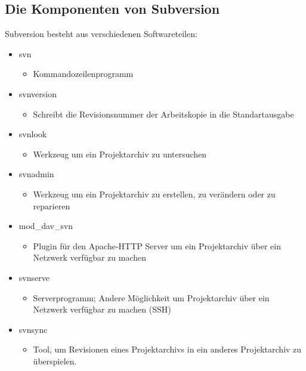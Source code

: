 \subsection{Die Komponenten von Subversion}
Subversion besteht aus verschiedenen Softwareteilen:
\begin{itemize}
    \item svn
        \begin{itemize}
            \item Kommandozeilenprogramm
        \end{itemize}
    \item svnversion
        \begin{itemize}
            \item Schreibt die Revisionsnummer der Arbeitskopie in die Standartausgabe
        \end{itemize}
    \item svnlook
        \begin{itemize}
            \item Werkzeug um ein Projektarchiv zu untersuchen
        \end{itemize}
    \item svnadmin
        \begin{itemize}
            \item Werkzeug um ein Projektarchiv zu erstellen, zu ver\"andern oder zu reparieren
        \end{itemize}
    \item mod\_dav\_svn
        \begin{itemize}
            \item Plugin f\"ur den Apache-HTTP Server um ein Projektarchiv  \"uber ein Netzwerk verf\"ugbar zu machen
        \end{itemize}
    \item svnserve
        \begin{itemize}
            \item Serverprogramm; Andere M\"oglichkeit um Projektarchiv \"uber ein Netzwerk verf\"ugbar zu machen (SSH)
        \end{itemize}
    \item svnsync
        \begin{itemize}
            \item Tool, um Revisionen eines Projektarchivs in ein anderes Projektarchiv zu \"uberspielen.
        \end{itemize}
\end{itemize}

